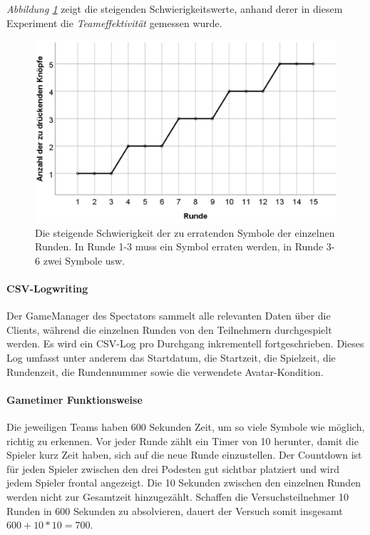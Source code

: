 \documentclass[a4paper,11pt]{article}%
\renewcommand{\\}{\vspace*{0.5\baselineskip} \newline}
\begin{document}
\textit{Abbildung \ref{RoundDifficulty}} zeigt die steigenden Schwierigkeitswerte, anhand derer in diesem Experiment die \textit{Teameffektivität} gemessen wurde.

\begin{figure}[H]
		\begin{footnotesize}
		\centering
			\includegraphics[scale=0.4]{Abbildungen/RoundDifficulty.JPG}	
			\caption[Der Schwierigkeitsgrad der Runden]{Die steigende Schwierigkeit der zu erratenden Symbole der einzelnen Runden. In Runde 1-3 muss ein Symbol erraten werden, in Runde 3-6 zwei Symbole usw.}
			\label{RoundDifficulty}
		\end{footnotesize}
	\end{figure}

\paragraph{CSV-Logwriting}
Der GameManager des Spectators sammelt alle relevanten Daten über die Clients, während die einzelnen Runden von den Teilnehmern durchgespielt werden. Es wird ein CSV-Log pro Durchgang inkrementell fortgeschrieben. Dieses Log umfasst unter anderem das Startdatum, die Startzeit, die Spielzeit, die Rundenzeit, die Rundennummer sowie die verwendete Avatar-Kondition.

\paragraph{Gametimer Funktionsweise}
Die jeweiligen Teams haben 600 Sekunden Zeit, um so viele Symbole wie möglich, richtig zu erkennen. Vor jeder Runde zählt ein Timer von 10 herunter, damit die Spieler kurz Zeit haben, sich auf die neue Runde einzustellen. Der Countdown ist für jeden Spieler zwischen den drei Podesten gut sichtbar platziert und wird jedem Spieler frontal angezeigt. Die 10 Sekunden zwischen den einzelnen Runden werden nicht zur Gesamtzeit hinzugezählt. Schaffen die Versuchsteilnehmer 10 Runden in 600 Sekunden zu absolvieren, dauert der Versuch somit insgesamt \\
$600 + 10 * 10 = 700$.
\end{document}
